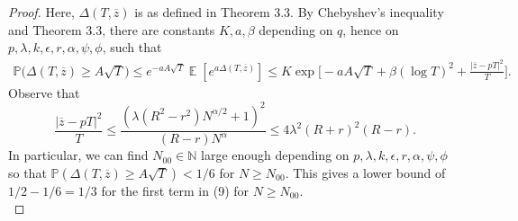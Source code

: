 \documentclass[12pt]{article}
\DeclareMathOperator{\ex}{\mathbb{E}}
\begin{document}
\begin{proof}
	Here, $\Delta(T,\overline{z})$ is as defined in Theorem 3.3. By Chebyshev's inequality and Theorem 3.3, there are constants $K,a,\beta$ depending on $q$, hence on $p,\lambda,k,\epsilon,r,\alpha,\psi,\phi$, such that 
	\begin{align*}
	\mathbb{P}\Big(\Delta(T,\overline{z}) \geq A\sqrt{T}\Big) \leq e^{-aA\sqrt{T}}\ex[e^{a\Delta(T,\overline{z})}] \leq K\exp\Big[-aA\sqrt{T} + \beta(\log T)^2 + \frac{|\overline{z} - pT|^2}{T}\Big].
	\end{align*}
	Observe that
	\[
	\frac{|\overline{z} - pT|^2}{T} \leq \frac{(\lambda(R^2-r^2) N^{\alpha/2} + 1)^2}{(R-r)N^\alpha} \leq 4\lambda^2(R+r)^2(R-r).
	\]
	In particular, we can find $N_{00}\in\mathbb{N}$ large enough depending on $p,\lambda,k,\epsilon,r,\alpha,\psi,\phi$ so that $\mathbb{P}(\Delta(T,\overline{z})\geq A\sqrt{T})<1/6$ for $N\geq N_{00}$. This gives a lower bound of $1/2 - 1/6 = 1/3$ for the first term in (9) for $N\geq N_{00}$.\\
	

\end{proof}
\end{document}
